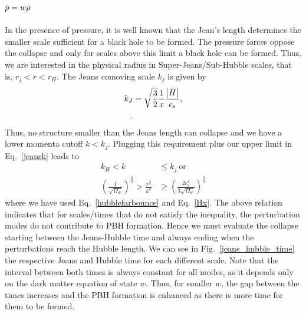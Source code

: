 \documentclass[a4paper,11pt]{article}
\begin{document}
\subsection{$\Bar{p} = w \bar{\rho}$}

In the presence of pressure, it is well known that the Jean's length determines the
smaller scale sufficient for a black hole to be formed. The pressure forces oppose the
collapse and only for scales above this limit a black hole can be formed. Thus, we are
interested in the physical radius in Super-Jeans/Sub-Hubble scales, that is,
$r_j<r<r_H$. The Jeans comoving scale $k_j$ is given by~\cite{Quintin2016}
\begin{align}
	\label{jeansk}
	k_J & = \sqrt{\frac{3}{2}}\frac{1}{x} \frac{\abs{\Bar{H}}}{c_s}, \\
	.\end{align}
Thus, no structure smaller than the Jeans length can collapse and we have a lower momenta cutoff $k<k_j$. Plugging this requirement plus our upper limit in Eq.~\eqref{jeansk} leads to
\begin{align}
	\label{jeanslimit}
	k_H<k                                                                            & \leq k_j~\text{or}\nonumber                                     \\
	\left(\frac{1}{\sqrt{\Omega_w}}\right)^{\frac{3}{2}}>\frac{x^{\frac{2}{3}}}{k^3} & \geq \left(\frac{2c_s^2}{3\sqrt{\Omega_w}}\right)^{\frac{3}{2}}
\end{align}
where we have used Eq.~\eqref{hubblefarbounce} and Eq.~\eqref{Hx}. The above relation indicates that for scales/times that do not satisfy the inequality, the perturbation modes do not contribute to PBH formation. Hence we must evaluate the collapse starting between the Jeans-Hubble time and always ending when the perturbations reach the Hubble length. We can see in Fig.~\ref{jeans_hubble_time} the respective Jeans and Hubble time for each different scale. Note that the interval between both times is always constant for all modes, as it depends only on the dark matter equation of state $w$. Thus, for smaller $w$, the gap between the times increases and the PBH formation is enhanced as there is more time for them to be formed.
\end{document}
